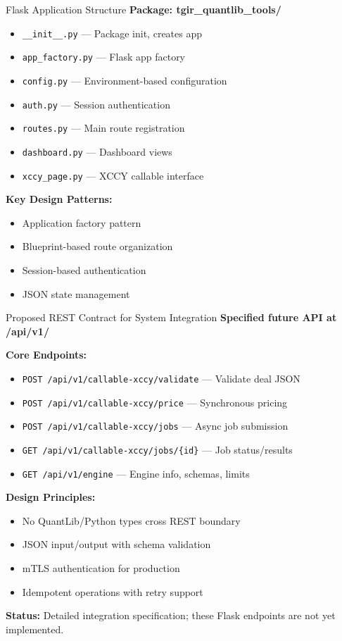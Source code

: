 \documentclass[aspectratio=169,11pt]{beamer}
\begin{document}
\begin{frame}{Flask Application Structure}
\textbf{Package: tgir\_quantlib\_tools/}
\begin{itemize}
    \item \texttt{\_\_init\_\_.py} --- Package init, creates app
    \item \texttt{app\_factory.py} --- Flask app factory
    \item \texttt{config.py} --- Environment-based configuration
    \item \texttt{auth.py} --- Session authentication
    \item \texttt{routes.py} --- Main route registration
    \item \texttt{dashboard.py} --- Dashboard views
    \item \texttt{xccy\_page.py} --- XCCY callable interface
\end{itemize}

\textbf{Key Design Patterns:}
\begin{itemize}
    \item Application factory pattern
    \item Blueprint-based route organization
    \item Session-based authentication
    \item JSON state management
\end{itemize}
\end{frame}

\begin{frame}{Proposed REST Contract for System Integration}
\textbf{Specified future API at /api/v1/}

\textbf{Core Endpoints:}
\begin{itemize}
    \item \texttt{POST /api/v1/callable-xccy/validate} --- Validate deal JSON
    \item \texttt{POST /api/v1/callable-xccy/price} --- Synchronous pricing
    \item \texttt{POST /api/v1/callable-xccy/jobs} --- Async job submission
    \item \texttt{GET /api/v1/callable-xccy/jobs/\{id\}} --- Job status/results
    \item \texttt{GET /api/v1/engine} --- Engine info, schemas, limits
\end{itemize}

\textbf{Design Principles:}
\begin{itemize}
    \item No QuantLib/Python types cross REST boundary
    \item JSON input/output with schema validation
    \item mTLS authentication for production
    \item Idempotent operations with retry support
\end{itemize}

\textbf{Status:} Detailed integration specification; these Flask endpoints are not yet implemented.
\end{frame}
\end{document}
